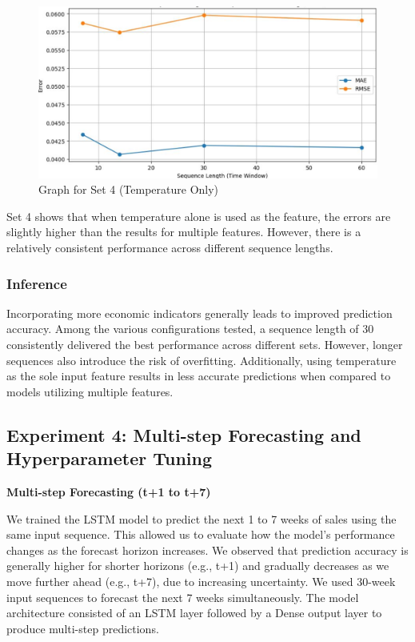 \documentclass[conference]{IEEEtran}
\begin{document}
\begin{figure}[H]
\centering
\includegraphics[width=0.95\linewidth]{set4.png}
\caption{Graph for Set 4 (Temperature Only)}
\label{fig:set4}
\end{figure}

Set 4 shows that when temperature alone is used as the feature, the errors are slightly higher than the results for multiple features. However, there is a relatively consistent performance across different sequence lengths.

\subsubsection{Inference}
Incorporating more economic indicators generally leads to improved prediction accuracy. Among the various configurations tested, a sequence length of 30 consistently delivered the best performance across different sets. However, longer sequences also introduce the risk of overfitting. Additionally, using temperature as the sole input feature results in less accurate predictions when compared to models utilizing multiple features.


\subsection{Experiment 4: Multi-step Forecasting and Hyperparameter Tuning}

\textbf{Multi-step Forecasting (t+1 to t+7)}\par
We trained the LSTM model to predict the next 1 to 7 weeks of sales using the same input sequence. This allowed us to evaluate how the model's performance changes as the forecast horizon increases. We observed that prediction accuracy is generally higher for shorter horizons (e.g., t+1) and gradually decreases as we move further ahead (e.g., t+7), due to increasing uncertainty.
We used 30-week input sequences to forecast the next 7 weeks simultaneously. The model architecture consisted of an LSTM layer followed by a Dense output layer to produce multi-step predictions.
\end{document}
